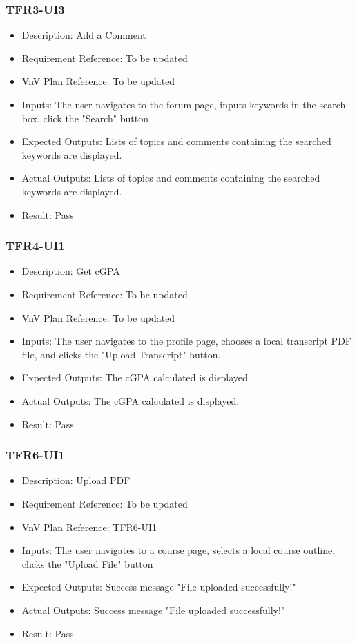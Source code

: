 \documentclass[12pt, titlepage]{article}
\begin{document}
\subsubsection{TFR3-UI3}\label{3.2.5}
\begin{itemize}
    \item Description: Add a Comment
    \item Requirement Reference: To be updated
    \item VnV Plan Reference: To be updated
    \item Inputs: The user navigates to the forum page, inputs keywords in the search box, click the "Search" button
    \item Expected Outputs: Lists of topics and comments containing the searched keywords are displayed.
    \item Actual Outputs: Lists of topics and comments containing the searched keywords are displayed.
    \item Result: Pass
\end{itemize}

\subsubsection{TFR4-UI1}\label{3.2.6}
\begin{itemize}
    \item Description: Get cGPA
    \item Requirement Reference: To be updated
    \item VnV Plan Reference: To be updated
    \item Inputs: The user navigates to the profile page, chooses a local transcript PDF file, and clicks the "Upload Transcript" button.
    \item Expected Outputs: The cGPA calculated is displayed.
    \item Actual Outputs: The cGPA calculated is displayed.
    \item Result: Pass
\end{itemize}


\subsubsection{TFR6-UI1}\label{3.2.7}
\begin{itemize}
    \item Description: Upload PDF
    \item Requirement Reference: To be updated
    \item VnV Plan Reference: TFR6-UI1
    \item Inputs: The user navigates to a course page, selects a local course outline, clicks the "Upload File" button
    \item Expected Outputs: Success message "File uploaded successfully!"
    \item Actual Outputs: Success message "File uploaded successfully!"
    \item Result: Pass
\end{itemize}
\end{document}
